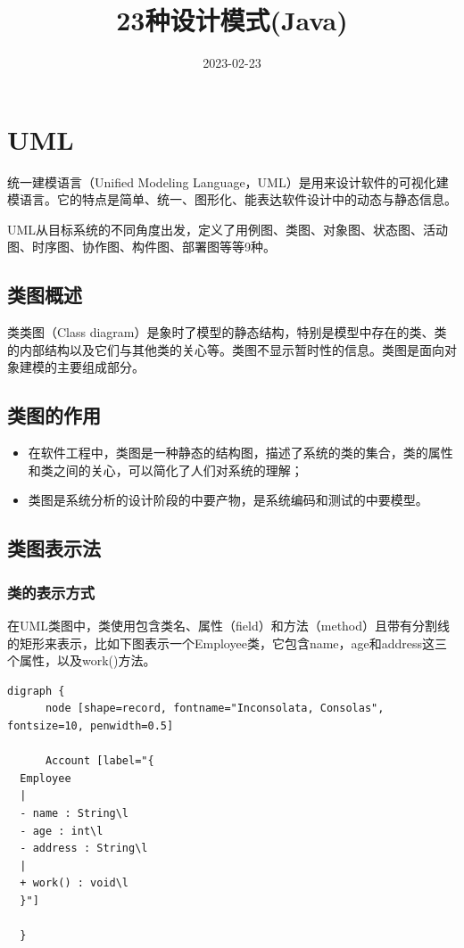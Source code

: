 \documentclass[11pt]{article}
\date{2023-02-23}
\title{23种设计模式(Java)}
\begin{document}
\maketitle
\tableofcontents

\section{UML}
\label{sec:orgaa5b113}
统一建模语言（Unified Modeling Language，UML）是用来设计软件的可视化建模语言。它的特点是简单、统一、图形化、能表达软件设计中的动态与静态信息。

UML从目标系统的不同角度出发，定义了用例图、类图、对象图、状态图、活动图、时序图、协作图、构件图、部署图等等9种。

\subsection{类图概述}
\label{sec:orga9debd5}
类类图（Class diagram）是象时了模型的静态结构，特别是模型中存在的类、类的内部结构以及它们与其他类的关心等。类图不显示暂时性的信息。类图是面向对象建模的主要组成部分。

\subsection{类图的作用}
\label{sec:org30b5858}
\begin{itemize}
\item 在软件工程中，类图是一种静态的结构图，描述了系统的类的集合，类的属性和类之间的关心，可以简化了人们对系统的理解；
\item 类图是系统分析的设计阶段的中要产物，是系统编码和测试的中要模型。
\end{itemize}

\subsection{类图表示法}
\label{sec:org0463951}
\subsubsection{类的表示方式}
\label{sec:org6e56811}
在UML类图中，类使用包含类名、属性（field）和方法（method）且带有分割线的矩形来表示，比如下图表示一个Employee类，它包含name，age和address这三个属性，以及work()方法。

\begin{verbatim}
digraph {
      node [shape=record, fontname="Inconsolata, Consolas", fontsize=10, penwidth=0.5]

      Account [label="{
  Employee
  |
  - name : String\l
  - age : int\l
  - address : String\l
  |
  + work() : void\l
  }"]

  }
\end{verbatim}
\end{document}
